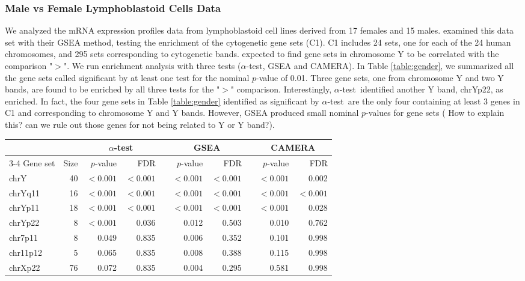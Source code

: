 \documentclass[useAMS,usenatbib, galley]{biom}
\newcommand{\OurMethod}{$\alpha$-test}
\begin{document}
	
	\subsubsection{Male vs Female Lymphoblastoid Cells Data}
	We analyzed the mRNA expression profiles data from lymphoblastoid cell lines derived from 17 females and 15 males. \cite{subramanian2005gene} examined this data set with their GSEA method, testing the enrichment of the  cytogenetic gene sets (C1). C1 includes 24 sets, one for each of the 24 human chromosomes, and 295 sets corresponding to cytogenetic bands. \cite{subramanian2005gene} expected to find gene sets in chromosome Y to be correlated with the comparison "$>$". We run enrichment analysis with three tests (\OurMethod, GSEA and CAMERA). In Table \ref{table:gender}, we summarized all the gene sets called significant by at least one test for the nominal $p$-value of 0.01. Three gene sets, one from chromosome Y and two Y bands, are found to be enriched by all three tests for the "$>$" comparison. Interestingly, \OurMethod~identified another Y band, chrYp22, as enriched. In fact, the four gene sets in Table \ref{table:gender} identified as significant by \OurMethod~are the only four containing at least 3 genes in C1 and corresponding to chromosome Y and Y bands. However, GSEA produced small nominal $p$-values for gene sets ( How to explain this? can we rule out those genes for not being related to Y or Y band?).
	
	\begin{table*}[ht]
		\centering
		\caption{Gene sets for lymphoblastoid cells data.}
		\begin{tabular}{lrrr c rr c rr} \hline\hline 
			& &  \multicolumn{2}{c}{\OurMethod} & & \multicolumn{2}{c}{GSEA}	& & \multicolumn{2}{c}{CAMERA} \\	
			\cline{3-4}  \cline{6-7} \cline{9-10}
			Gene set & Size & $p$-value & FDR & & $p$-value & FDR & &$p$-value & FDR \\ 
			\hline
			chrY & 40 & $<0.001$ & $<0.001$ & &$<0.001$ & $<0.001$ & & $<0.001$ & 0.002 \\ 
			chrYq11 & 16 & $<0.001$ & $<0.001$& & $<0.001$ & $<0.001$ & & $<0.001$ & $<0.001$ \\ 
			chrYp11 & 18 & $<0.001$ & $<0.001$ & & $<0.001$ & $<0.001$& & $<0.001$ & 0.028 \\ 
			chrYp22 & 8 & $<0.001$ & 0.036& & 0.012 & 0.503 & & 0.010 & 0.762 \\ 
			chr7p11 & 8 & 0.049 & 0.835 & & 0.006 & 0.352 & & 0.101 & 0.998 \\ 
			chr11p12 & 5 & 0.065 & 0.835& & 0.008 & 0.388 & & 0.115 & 0.998 \\ 
			chrXp22 & 76 & 0.072 & 0.835& & 0.004 & 0.295 & & 0.581 & 0.998 \\  
			\hline\hline
		\end{tabular}
		\label{table:gender}
	\end{table*}
	
\end{document}
